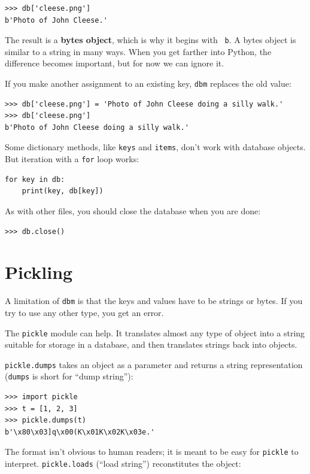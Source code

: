 \documentclass[10pt]{book}
\begin{document}
\begin{verbatim}
>>> db['cleese.png']
b'Photo of John Cleese.'
\end{verbatim}
%
The result is a {\bf bytes object}, which is why it begins with {\tt
  b}.  A bytes object is similar to a string in many ways.  When you
get farther into Python, the difference becomes important, but for now
we can ignore it.

If you make another assignment to an existing key, {\tt dbm} replaces
the old value:

\begin{verbatim}
>>> db['cleese.png'] = 'Photo of John Cleese doing a silly walk.'
>>> db['cleese.png']
b'Photo of John Cleese doing a silly walk.'
\end{verbatim}
%

Some dictionary methods, like {\tt keys} and {\tt items}, don't
work with database objects.  But iteration with a {\tt for}
loop works:

\begin{verbatim}
for key in db:
    print(key, db[key])
\end{verbatim}
%
As with other files, you should close the database when you are
done:

\begin{verbatim}
>>> db.close()
\end{verbatim}
%


\section{Pickling}

A limitation of {\tt dbm} is that the keys and values have to be
strings or bytes.  If you try to use any other type, you get an error.
 

The {\tt pickle} module can help.  It translates
almost any type of object into a string suitable for storage in a
database, and then translates strings back into objects.

{\tt pickle.dumps} takes an object as a parameter and returns
a string representation ({\tt dumps} is short for ``dump string''):

\begin{verbatim}
>>> import pickle
>>> t = [1, 2, 3]
>>> pickle.dumps(t)
b'\x80\x03]q\x00(K\x01K\x02K\x03e.'
\end{verbatim}
%
The format isn't obvious to human readers; it is meant to be
easy for {\tt pickle} to interpret.  {\tt pickle.loads}
(``load string'') reconstitutes the object:
\end{document}
